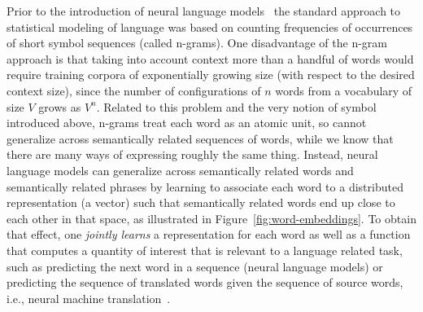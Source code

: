 \documentclass[]{article}
\begin{document}
Prior to the introduction of neural language
models~\citet{BenDucVin01-short} the standard approach to statistical
modeling of language was based on counting frequencies of occurrences of
short symbol sequences (called n-grams). One disadvantage of the n-gram
approach is that taking into account context more than a handful of words would require
training corpora of exponentially growing size (with respect to the
desired context size), since the number of configurations of $n$
words from a vocabulary of size $V$ grows as $V^n$. Related to this
problem and the very notion of symbol introduced above, n-grams
treat each word as an atomic unit, so cannot generalize across
semantically related sequences of words,
while we know that there are many ways of expressing roughly the same thing.
Instead, neural language models can generalize across semantically related words
and semantically related phrases by learning to associate each word to a
distributed representation (a vector) such that semantically related
words end up close to each other in that space, as illustrated in
Figure~\ref{fig:word-embeddings}. To obtain that effect, one
{\em jointly learns} a representation for each word as well as
a function that computes a quantity of interest that is relevant
to a language related task, such as predicting the next word
in a sequence (neural language models) or predicting the sequence
of translated words given the sequence of source words, i.e., neural
machine translation~\citep{Bahdanau-et-al-arxiv2014,Sutskever-et-al-NIPS2014}.
\end{document}
